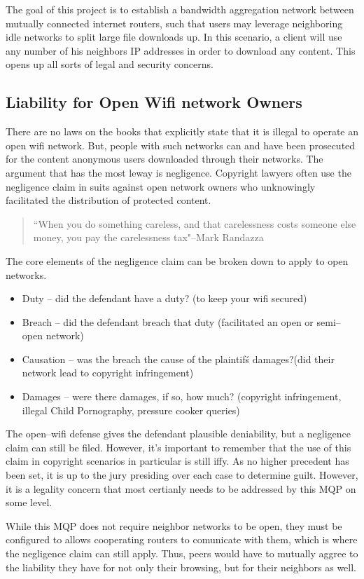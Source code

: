 \documentclass{article}
\begin{document}
The goal of this project is to establish a bandwidth aggregation network between mutually connected internet routers, such that users may leverage neighboring idle networks to split large file downloads up. In this scenario, a client will use any number of his neighbors IP addresses in order to download any content. This opens up all sorts of legal and security concerns. 

\subsection{Liability for Open Wifi network Owners}

There are no laws on the books that explicitly state that it is illegal to operate an open wifi network. But, people with such networks can and have been prosecuted for the content anonymous users downloaded through their networks. The argument that has the most leway is negligence. Copyright lawyers often use the negligence claim in suits against open network owners who unknowingly facilitated the distribution of protected content.

\begin{quotation}``When you do something careless, and that carelessness costs someone else money, you pay the carelessness tax"--Mark Randazza\end{quotation}

The core elements of the negligence claim can be broken down to apply to open networks.
\begin{itemize}
\item Duty -- did the defendant have a duty? (to keep your wifi secured)
\item Breach -- did the defendant breach that duty (facilitated an open or semi--open network)
\item Causation -- was the breach the cause of the plaintif\'s damages?(did their network lead to copyright infringement)
\item Damages -- were there damages, if so, how much? (copyright infringement, illegal Child Pornography, pressure cooker queries)
\end{itemize}

The open--wifi defense gives the defendant plausible deniability, but a negligence claim can still be filed. However, it's important to remember that the use of this claim in copyright scenarios in particular is still iffy. As no higher precedent has been set, it is up to the jury presiding over each case to determine guilt. However, it is a legality concern that most certianly needs to be addressed by this MQP on some level.

While this MQP does not require neighbor networks to be open, they must be configured to allows cooperating routers to comunicate with them, which is where the negligence claim can still apply. Thus, peers would have to mutually aggree to the liability they have for not only their browsing, but for their neighbors as well. 
\end{document}

